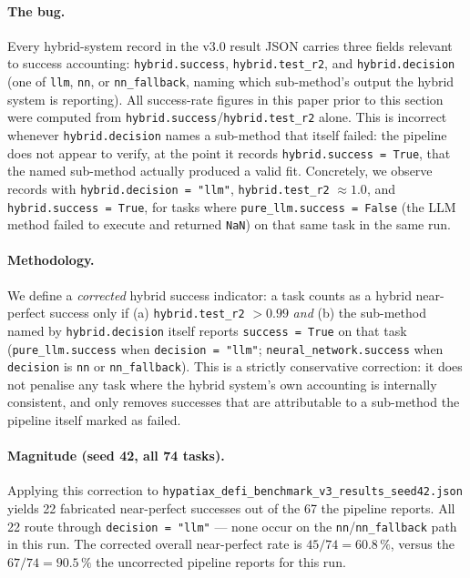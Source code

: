 \documentclass[twoside,11pt]{article}
\begin{document}
\paragraph{The bug.} Every hybrid-system record in the v3.0 result JSON carries
three fields relevant to success accounting: \texttt{hybrid.success},
\texttt{hybrid.test\_r2}, and \texttt{hybrid.decision} (one of \texttt{llm},
\texttt{nn}, or \texttt{nn\_fallback}, naming which sub-method's output the
hybrid system is reporting). All success-rate figures in this paper prior to
this section were computed from \texttt{hybrid.success}/\texttt{hybrid.test\_r2}
alone. This is incorrect whenever \texttt{hybrid.decision} names a sub-method
that itself failed: the pipeline does not appear to verify, at the point it
records \texttt{hybrid.success = True}, that the named sub-method actually
produced a valid fit. Concretely, we observe records with
\texttt{hybrid.decision = "llm"}, \texttt{hybrid.test\_r2} $\approx 1.0$, and
\texttt{hybrid.success = True}, for tasks where \texttt{pure\_llm.success =
False} (the LLM method failed to execute and returned \texttt{NaN}) on that
same task in the same run.

\paragraph{Methodology.} We define a \emph{corrected} hybrid success indicator:
a task counts as a hybrid near-perfect success only if (a)
\texttt{hybrid.test\_r2} $> 0.99$ \emph{and} (b) the sub-method named by
\texttt{hybrid.decision} itself reports \texttt{success = True} on that task
(\texttt{pure\_llm.success} when \texttt{decision = "llm"};
\texttt{neural\_network.success} when \texttt{decision} is \texttt{nn} or
\texttt{nn\_fallback}). This is a strictly conservative correction: it does
not penalise any task where the hybrid system's own accounting is internally
consistent, and only removes successes that are attributable to a sub-method
the pipeline itself marked as failed.

\paragraph{Magnitude (seed 42, all 74 tasks).} Applying this correction to
\texttt{hypatiax\_defi\_benchmark\_v3\_results\_seed42.json} yields 22 fabricated
near-perfect successes out of the 67 the pipeline reports. All 22 route through
\texttt{decision = "llm"} --- none occur on the \texttt{nn}/\texttt{nn\_fallback}
path in this run. The corrected overall near-perfect rate is $45/74 = 60.8\,\%$,
versus the $67/74 = 90.5\,\%$ the uncorrected pipeline reports for this run.
\end{document}
